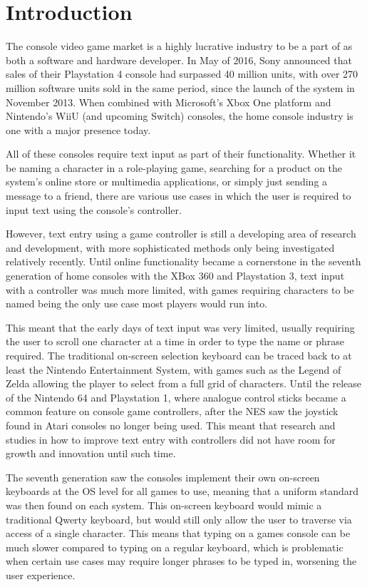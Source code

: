 \documentclass[requirements.tex]{subfiles}
\begin{document}
\section{Introduction} %
\label{sec:introduction}

The console video game market is a highly lucrative industry to be a part of as
both a software and hardware developer. In May of 2016, Sony announced that
sales of their Playstation 4 console had surpassed 40 million units, with over
270 million software units sold in the same period, since the launch of the
system in November 2013\cite{sony}. When combined with Microsoft's Xbox One
platform and Nintendo's WiiU (and upcoming Switch) consoles, the home console
industry is one with a major presence today.

All of these consoles require text input as part of their functionality. Whether
it be naming a character in a role-playing game, searching for a product on the
system's online store or multimedia applications, or simply just sending a
message to a friend, there are various use cases in which the user is required
to input text using the console's controller.

However, text entry using a game controller is still a developing area of
research and development, with more sophisticated methods only being
investigated relatively recently. Until online functionality became a
cornerstone in the seventh generation of home consoles with the XBox 360 and
Playstation 3, text input with a controller was much more limited, with games
requiring characters to be named being the only use case most players would
run into. 

This meant that the early days of text input was very limited, usually requiring
the user to scroll one character at a time in order to type the name or phrase
required. The traditional on-screen selection keyboard can be traced back to
at least the Nintendo Entertainment System, with games such as the Legend of
Zelda allowing the player to select from a full grid of characters. Until the
release of the Nintendo 64 and Playstation 1, where analogue control sticks
became a common feature on console game controllers, after the NES saw the
joystick found in Atari consoles no longer being used. This meant that research
and studies in how to improve text entry with controllers did not have room for
growth and innovation until such time.

The seventh generation saw the consoles implement their own on-screen keyboards
at the OS level for all games to use, meaning that a uniform standard was then
found on each system. This on-screen keyboard would mimic a traditional Qwerty
keyboard, but would still only allow the user to traverse via access of a single
character. This means that typing on a games console can be much slower compared
to typing on a regular keyboard, which is problematic when certain use cases may
require longer phrases to be typed in, worsening the user experience.
\end{document}
